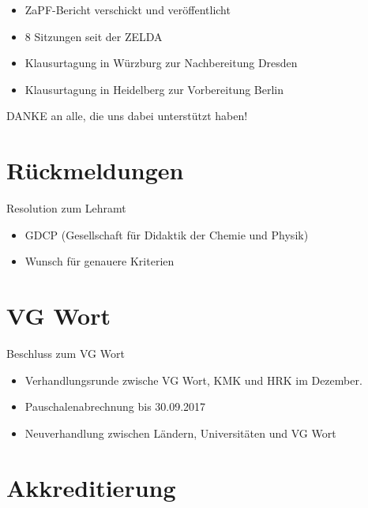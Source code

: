 \documentclass[compress, aspectratio=169]{beamer}
\begin{document}
\begin{frame}
  \begin{itemize}
    \item ZaPF-Bericht verschickt und veröffentlicht
    \item 8 Sitzungen seit der ZELDA
    \item Klausurtagung in Würzburg zur Nachbereitung Dresden
    \item Klausurtagung in Heidelberg zur Vorbereitung Berlin
    \end{itemize}
    \vspace{5mm}
    \begin{center}
      \Large DANKE an alle, die uns dabei unterstützt haben!
    \end{center}
\end{frame}

\section{Rückmeldungen}

\begin{frame}{Resolution zum Lehramt}
  \begin{itemize}
  \item GDCP (Gesellschaft für Didaktik der Chemie und Physik) 
  \item Wunsch für genauere Kriterien
  \end{itemize}
\end{frame}

\section{VG Wort}

\begin{frame}{Beschluss zum VG Wort}
  \begin{itemize}
  \item Verhandlungsrunde zwische VG Wort, KMK und HRK im Dezember.
  \item Pauschalenabrechnung bis 30.09.2017
  \item Neuverhandlung zwischen Ländern, Universitäten und VG Wort
  \end{itemize}
\end{frame}

\section{Akkreditierung}
\end{document}
